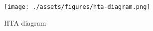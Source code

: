 \begin{landscape}
    \begin{figure}[p]
        \centering
        \texttt{[image: ./assets/figures/hta-diagram.png]}
        \captionsetup{justification=centering}
        \caption{HTA diagram}
    \end{figure}
\end{landscape}
